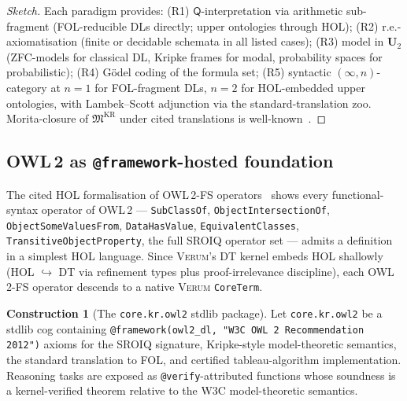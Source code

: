 \documentclass[11pt, a4paper]{article}
\theoremstyle{definition}
\newtheorem{construction}[theorem]{Construction}
\theoremstyle{remark}
\newcommand{\fM}{\mathfrak{M}}
\newcommand{\Verum}{\textsc{Verum}}
\newcommand{\OWL}{\textsc{OWL\,2}}
\begin{document}
\begin{proof}[Sketch]
Each paradigm provides: (R1) $\mathsf{Q}$-interpretation via arithmetic sub-fragment (FOL-reducible DLs directly; upper ontologies through HOL); (R2) r.e.-axiomatisation (finite or decidable schemata in all listed cases); (R3) model in $\mathbf{U}_2$ (ZFC-models for classical DL, Kripke frames for modal, probability spaces for probabilistic); (R4) G\"odel coding of the formula set; (R5) syntactic $(\infty, n)$-category at $n = 1$ for FOL-fragment DLs, $n = 2$ for HOL-embedded upper ontologies, with Lambek--Scott adjunction via the standard-translation zoo. Morita-closure of $\fM^{\mathrm{KR}}$ under cited translations is well-known~\cite{BaaderHandbook2017}.
\end{proof}

\subsection{OWL\,2 as \texttt{@framework}-hosted foundation}
\label{subsec:owl2-hosted}

The cited HOL formalisation of \OWL-FS operators~\cite{RudolphHorrocksHOL2019} shows every functional-syntax operator of \OWL{} --- \texttt{SubClassOf}, \texttt{ObjectIntersectionOf}, \texttt{ObjectSomeValuesFrom}, \texttt{DataHasValue}, \texttt{EquivalentClasses}, \texttt{TransitiveObjectProperty}, the full SROIQ operator set --- admits a definition in a simplest HOL language. Since \Verum's DT kernel embeds HOL shallowly (HOL $\hookrightarrow$ DT via refinement types plus proof-irrelevance discipline), each \OWL-FS operator descends to a native \Verum{} \texttt{CoreTerm}.

\begin{construction}[The \texttt{core.kr.owl2} stdlib package]
\label{constr:owl2-pkg}
Let \texttt{core.kr.owl2} be a stdlib cog containing \texttt{@framework(owl2\_dl, "W3C OWL\,2 Recommendation 2012")} axioms for the \textsf{SROIQ} signature, Kripke-style model-theoretic semantics, the standard translation to FOL, and certified tableau-algorithm implementation. Reasoning tasks are exposed as \texttt{@verify}-attributed functions whose soundness is a kernel-verified theorem relative to the W3C model-theoretic semantics.
\end{construction}
\end{document}
